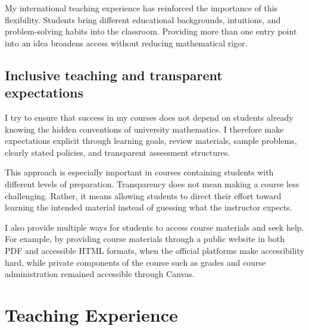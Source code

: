\documentclass[11pt]{article}
\begin{document}
My international teaching experience has reinforced the
importance of this flexibility.
Students bring different educational backgrounds,
intuitions, and problem-solving habits into the classroom.
Providing more than one entry point into an idea broadens
access without reducing mathematical rigor.

\subsection{Inclusive teaching and transparent expectations}

I try to ensure that success in my courses does not depend on
students already knowing the hidden conventions of university
mathematics.
I therefore make expectations explicit through learning goals,
review materials,
sample problems,
clearly stated policies,
and transparent assessment structures.

This approach is especially important in courses containing
students with different levels of preparation.
Transparency does not mean making a course less challenging.
Rather, it means allowing students to direct their effort
toward learning the intended material instead of guessing what
the instructor expects.

I also provide multiple ways for students to access course
materials and seek help.
For example, by providing
course materials through a public website
in both PDF and accessible HTML formats, when the official platforms make accessibility hard,
while private components of the course such as grades
and course administration remained accessible through Canvas.


\newpage

\section{Teaching Experience}

\small
\end{document}
